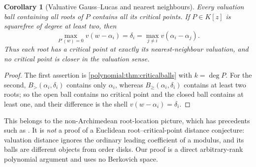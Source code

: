 \documentclass[11pt,letterpaper]{article}
\numberwithin{equation}{section}
\newtheorem{corollary}[theorem]{Corollary}
\theoremstyle{definition}
\theoremstyle{remark}\newtheorem{remark}[theorem]{Remark}
\newcommand{\Bge}[2]{B_{\ge}(#1,#2)}
\newcommand{\Bgt}[2]{B_{>}(#1,#2)}
\begin{document}
\begin{corollary}[Valuative Gauss--Lucas and nearest neighbours]
\label{polynomial:cor:nearest}
Every valuation ball containing all roots of $P$ contains all its critical
points. If $P\in K[z]$ is squarefree of degree at least two, then
\begin{equation}\label{polynomial:eq:nearest}
 \max_{P'(w)=0}v(w-\alpha_i)=\delta_i=\max_{j\ne i}v(\alpha_i-\alpha_j).
\end{equation}
Thus each root has a critical point at exactly its nearest-neighbour
valuation, and no critical point is closer in the valuation sense.
\end{corollary}
\begin{proof}
The first assertion is \cref{polynomial:thm:criticalballs} with $k=\deg P$.
For the second, $\Bgt{\alpha_i}{\delta_i}$ contains only $\alpha_i$, whereas
$\Bge{\alpha_i}{\delta_i}$ contains at least two roots; so the open ball
contains no critical point and the closed ball contains at least one, and
their difference is the shell $v(w-\alpha_i)=\delta_i$.
\end{proof}

This belongs to the non-Archimedean root-location picture, which has
precedents such as \cite{polynomial:ChoiLee,polynomial:Faber}. It is
\emph{not} a proof of a Euclidean root--critical-point distance conjecture:
valuation distance ignores the ordinary leading coefficient of a modulus, and
its balls are different objects from order disks. Our proof is a direct
arbitrary-rank polynomial argument and uses no Berkovich space.
\end{document}
